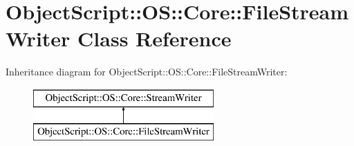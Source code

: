 \hypertarget{class_object_script_1_1_o_s_1_1_core_1_1_file_stream_writer}{}\section{Object\+Script\+:\+:OS\+:\+:Core\+:\+:File\+Stream\+Writer Class Reference}
\label{class_object_script_1_1_o_s_1_1_core_1_1_file_stream_writer}
Inheritance diagram for Object\+Script\+:\+:OS\+:\+:Core\+:\+:File\+Stream\+Writer\+:\begin{figure}[H]
\begin{center}
\leavevmode
\includegraphics[height=2.000000cm]{class_object_script_1_1_o_s_1_1_core_1_1_file_stream_writer}
\end{center}
\end{figure}
